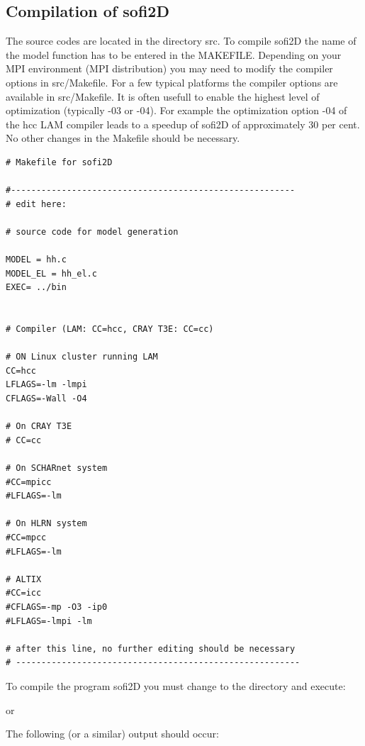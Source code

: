 \documentclass[11pt,onecolumn,oneside]{article}
\begin{document}
\subsection{Compilation of sofi2D}
\label{compexec}
The source codes are located in the directory src. To compile sofi2D the name of the model function has to be entered in the MAKEFILE. Depending on your MPI environment (MPI distribution) you may need to modify the compiler options in src/Makefile. For a few typical platforms the compiler options are available in src/Makefile. It is often usefull to enable the highest level of optimization (typically -03 or -04). For example the optimization option -04 of the hcc LAM compiler leads to a speedup of sofi2D of approximately 30 per cent. No other changes in the Makefile should be necessary. 
\begin{verbatim}
# Makefile for sofi2D

#--------------------------------------------------------
# edit here:

# source code for model generation

MODEL = hh.c
MODEL_EL = hh_el.c
EXEC= ../bin


# Compiler (LAM: CC=hcc, CRAY T3E: CC=cc)

# ON Linux cluster running LAM
CC=hcc
LFLAGS=-lm -lmpi 
CFLAGS=-Wall -O4

# On CRAY T3E
# CC=cc

# On SCHARnet system
#CC=mpicc
#LFLAGS=-lm  

# On HLRN system
#CC=mpcc
#LFLAGS=-lm  

# ALTIX
#CC=icc
#CFLAGS=-mp -O3 -ip0
#LFLAGS=-lmpi -lm 

# after this line, no further editing should be necessary
# --------------------------------------------------------
\end{verbatim}

To compile the program sofi2D you must change to the  directory and execute:

or

The following (or a similar) output should occur:
\end{document}
